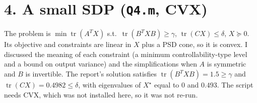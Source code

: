 \section*{4. A small SDP (\texttt{Q4.m}, CVX)}
The problem is $\min \operatorname{tr}(A^TX)$ s.t.\ $\operatorname{tr}(B^TXB)\ge\gamma$, $\operatorname{tr}(CX)\le\delta$, $X\succeq 0$. Its objective and constraints are linear in $X$ plus a PSD cone, so it is convex. I discussed the meaning of each constraint (a minimum controllability-type level and a bound on output variance) and the simplifications when $A$ is symmetric and $B$ is invertible. The report's solution satisfies $\operatorname{tr}(B^TXB)=1.5\ge\gamma$ and $\operatorname{tr}(CX)=0.4982\le\delta$, with eigenvalues of $X^\star$ equal to $0$ and $0.493$. The script needs CVX, which was not installed here, so it was not re-run.

